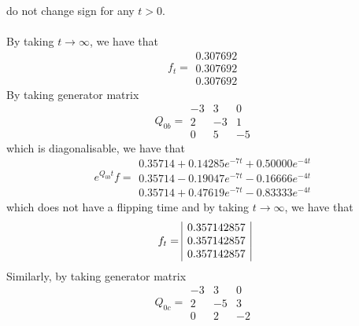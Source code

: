 \documentclass{article}
\begin{document}
do not change sign for any $t>0$.\\\\
By taking $t\to\infty$, we have that
\begin{equation*} 
 f_{t}= 
 \begin{array}{|r|}
  0.307692\\
  0.307692\\
  0.307692
 \end{array}
 \end{equation*}
By taking generator matrix 
\begin{equation*} 
 Q_{0b}= 
 \begin{array}{|rrr|}
  -3 & 3 & 0 \\
  2 & -3 & 1 \\
  0 & 5 & -5  
 \end{array}
 \end{equation*}
which is diagonalisable, we have that
\begin{equation*} 
 e^{Q_{0b}t}f = 
 \begin{array}{|r|}
  0.35714+0.14285e^{-7t}+0.50000e^{-4t}\\
  0.35714-0.19047e^{-7t}-0.16666e^{-4t}\\
  0.35714+0.47619e^{-7t}-0.83333e^{-4t}
 \end{array}
 \end{equation*}
which does not have a flipping time and by taking $t\to\infty$, we have that
\begin{equation*} 
 f_{t}= 
 \begin{array}{|r|}
  0.357142857\\
   0.357142857\\ 
   0.357142857
 \end{array}\\\\
 \end{equation*}
Similarly, by taking generator matrix 
\begin{equation*} 
 Q_{0c}= 
 \begin{array}{|rrr|}
  -3 & 3 & 0 \\
  2 & -5 & 3 \\
  0 & 2 & -2  
 \end{array}
 \end{equation*}
\end{document}
